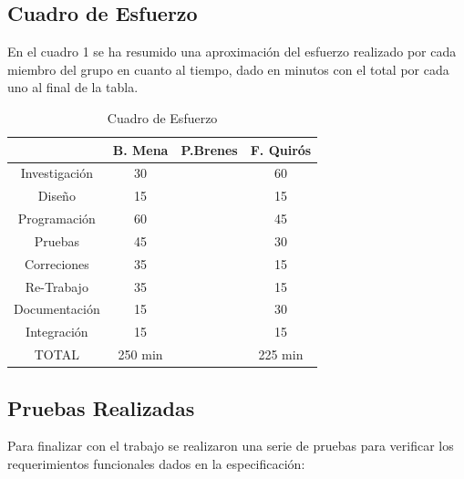 \documentclass[10pt,journal,compsoc]{IEEEtran}
\begin{document}
\subsection{Cuadro de Esfuerzo}
	\par En el cuadro 1 se ha resumido una aproximación del esfuerzo realizado por cada miembro del grupo en cuanto al tiempo, dado en minutos con el total por cada uno al final de la tabla.
	\begin{table}[H]
		\begin{center}
		\caption{Cuadro de Esfuerzo}
		\label{tab:table1}
		\begin{tabular}{c|c|c|c}
		&\textbf{B. Mena} & \textbf{P.Brenes} & \textbf{F. Quirós}\\
		\hline\newline
		Investigación	& 30 & &60 \\
		Diseño			& 15 & &15 \\
		Programación 	& 60 & &45 \\
		Pruebas 		& 45 & &30 \\
		Correciones 	& 35 & &15 \\
		Re-Trabajo 		& 35 & &15 \\
		Documentación 	& 15 & &30 \\
		Integración 	& 15 & &15 \\
		\hline
		\hline\newline
		TOTAL 			& 250 min & & 225 min
\end{tabular}
\end{center}
\end{table}
\subsection{Pruebas Realizadas}
	\par Para finalizar con el trabajo se realizaron una serie de pruebas para verificar los requerimientos funcionales dados en la especificación:
	
\end{document}
